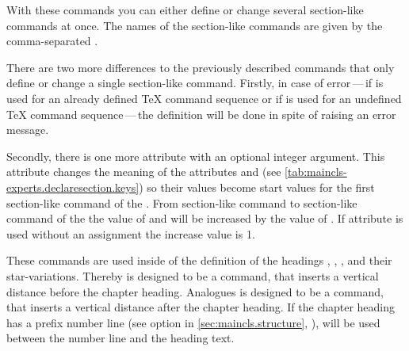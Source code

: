 \begin{Declaration}
\end{Declaration}
With these commands you can either define or change several
section-like commands at once. The names of the section-like commands are
given by the comma-separated .

There are two more differences to the previously described commands that only
define or change a single section-like command. Firstly, in case of error\,---\,if  is used for an already defined \TeX{}
command sequence or if  is used for an
undefined \TeX{} command sequence\,---\,the definition will be done in spite
of raising an error message.

Secondly, there is one more attribute  with an optional
integer argument. This attribute changes the meaning of the attributes
 and  (see
\autoref{tab:maincls-experts.declaresection.keys}) so their values become
start values for the first section-like command of the . From section-like command to section-like command of the  the value of  and 
will be increased by the value of . If attribute
 is used without an assignment the increase value is 1.
%
\EndIndexGroup


\begin{Declaration}
\end{Declaration}
These commands are used inside of the definition of the headings
, , ,
 and their star-variations. Thereby
 is designed to be a command, that inserts a
vertical distance before the chapter heading. Analogues
 is designed to be a command, that inserts a vertical
distance after the chapter heading. If the chapter heading has a prefix number line (see option
 in \autoref{sec:maincls.structure},
), 
will be used between the number line and the heading text.

